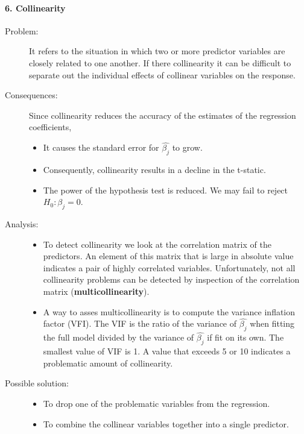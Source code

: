 \documentclass[a4paper]{article}
\begin{document}
						\paragraph{6. Collinearity}
						\begin{description}
							\item[Problem:] It refers to the situation in which two or more predictor variables are closely related to one another. If there collinearity it can be difficult to separate out the individual effects of collinear variables on the response.
							
							\item[Consequences:] Since collinearity reduces the accuracy of the estimates of the regression coefficients, 
								\begin{itemize}
									\item It causes the standard error for $\hat{\beta_j}$ to grow. 
									\item Consequently, collinearity results in a decline in the t-static.
									\item The power of the hypothesis test is reduced. We may fail to reject $H_0: \beta_j = 0$.
								\end{itemize}
							
							\item[Analysis:] \quad
							\begin{itemize}
								\item To detect collinearity we look at the correlation matrix of the predictors. An element of this matrix that is large in absolute value indicates a pair of highly correlated variables. Unfortunately, not all collinearity problems can be detected by inspection of the correlation matrix	 (\textbf{multicollinearity}).
								\item A way to asses multicollinearity is to compute the variance inflation factor (VFI). The VIF is the ratio of the variance of $\hat{\beta_j}$ when fitting the full model divided by the variance of $\hat{\beta_j}$ if fit on its own. The smallest value of VIF is 1. A value that exceeds 5 or 10 indicates a problematic amount of collinearity.
							\end{itemize}														
														
																
							\item[Possible solution:] \quad		
							\begin{itemize}
								\item To drop one of the problematic variables from the regression.
								\item To combine the collinear variables together into a single predictor.			
							\end{itemize}								
						
						\end{description}
				
\end{document}
